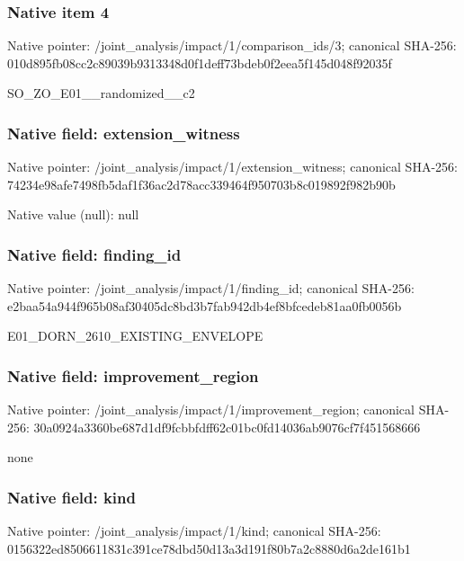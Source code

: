 \documentclass[10pt,a4paper]{article}
\begin{document}
\subsubsection{Native item 4}
Native pointer: /joint\_\allowbreak{}analysis/impact/1/comparison\_\allowbreak{}ids/3; canonical SHA-256: 010d895fb08cc2c89039b9313348d0f1deff73bdeb0f2eea5f145d048f92035f

\begingroup\raggedright\sloppy SO\_\allowbreak{}ZO\_\allowbreak{}E01\_\allowbreak{}\_\allowbreak{}randomized\_\allowbreak{}\_\allowbreak{}c2\par\endgroup

\subsubsection{Native field: extension\_\allowbreak{}witness}
Native pointer: /joint\_\allowbreak{}analysis/impact/1/extension\_\allowbreak{}witness; canonical SHA-256: 74234e98afe7498fb5daf1f36ac2d78acc339464f950703b8c019892f982b90b

Native value (null): null

\subsubsection{Native field: finding\_\allowbreak{}id}
Native pointer: /joint\_\allowbreak{}analysis/impact/1/finding\_\allowbreak{}id; canonical SHA-256: e2baa54a944f965b08af30405dc8bd3b7fab942db4ef8bfcedeb81aa0fb0056b

\begingroup\raggedright\sloppy E01\_\allowbreak{}DORN\_\allowbreak{}2610\_\allowbreak{}EXISTING\_\allowbreak{}ENVELOPE\par\endgroup

\subsubsection{Native field: improvement\_\allowbreak{}region}
Native pointer: /joint\_\allowbreak{}analysis/impact/1/improvement\_\allowbreak{}region; canonical SHA-256: 30a0924a3360be687d1df9fcbbfdff62c01bc0fd14036ab9076cf7f451568666

\begingroup\raggedright\sloppy none\par\endgroup

\subsubsection{Native field: kind}
Native pointer: /joint\_\allowbreak{}analysis/impact/1/kind; canonical SHA-256: 0156322ed8506611831c391ce78dbd50d13a3d191f80b7a2c8880d6a2de161b1
\end{document}
